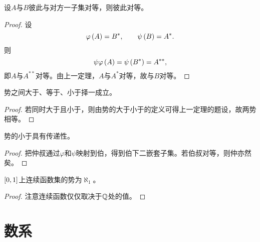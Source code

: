 \documentclass{ctexrep}
\begin{document}
  \begin{theorem}设$A$与$B$彼此与对方一子集对等，则彼此对等。
  \end{theorem}
  \begin{proof}
    设
    \[ \varphi\left(A\right) = B^*,\qquad \psi\left(B\right)=A^*. \]
    则
    \[ \psi\varphi\left(A\right) = \psi\left(B^*\right) = A^{**}, \]
    即$A$与$A^{**}$对等。由上一定理，$A$与$A^*$对等，故与$B$对等。
  \end{proof}
  \begin{collary}
    势之间大于、等于、小于择一成立。
  \end{collary}
  \begin{proof}
    若同时大于且小于，则由势的大于小于的定义可得上一定理的题设，故两势相等。
  \end{proof}
  \begin{collary}
    势的小于具有传递性。
  \end{collary}
  \begin{proof}
    把仲叔通过$\varphi$和$\psi$映射到伯，得到伯下二嵌套子集。若伯叔对等，则仲亦然矣。
  \end{proof}
  \begin{theorem}
    $\left[0,1\right]$上连续函数集的势为$\aleph_1$。
  \end{theorem}
  \begin{proof}
    注意连续函数仅仅取决于$\mathbb{Q}$处的值。
  \end{proof}
  \section{数系}
\end{document}
